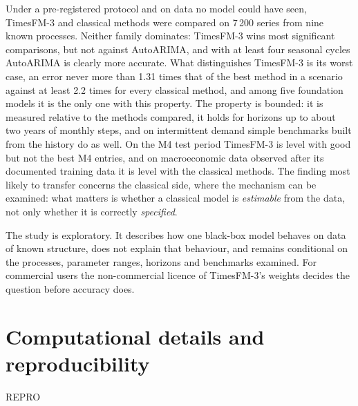Under a pre-registered protocol and on data no model could have seen, TimesFM-3 and classical methods were
compared on 7\,200 series from nine known processes. Neither family dominates: TimesFM-3 wins most
significant comparisons, but not against AutoARIMA, and with at least four seasonal cycles AutoARIMA is
clearly more accurate. What distinguishes TimesFM-3 is its worst case, an error never more than 1.31 times that of the best method in a scenario against at least
2.2 times for every classical method, and among five foundation models it is
the only one with this property. The property is bounded: it is measured relative to the methods compared,
it holds for horizons up to about two years of monthly steps, and on intermittent demand simple benchmarks
built from the history do as well. On the M4 test period TimesFM-3 is level with good but not the best M4 entries, and on macroeconomic data
observed after its documented training data it is level with the classical methods. The finding most likely to transfer concerns the classical side, where the mechanism can be
examined: what matters is whether a classical model is \emph{estimable} from the data, not only whether it is
correctly \emph{specified}.

The study is exploratory. It describes how one black-box model behaves on data of known structure, does not
explain that behaviour, and remains conditional on the processes, parameter ranges, horizons and benchmarks
examined. For commercial users the non-commercial licence of TimesFM-3's weights decides the question before
accuracy does.

\section{Computational details and reproducibility}
\label{sec:repro}

REPRO

